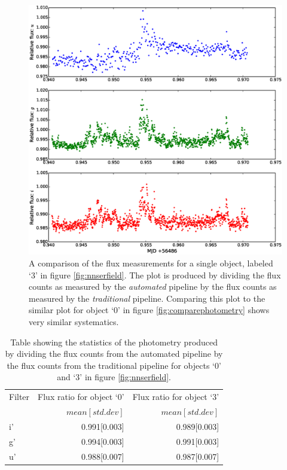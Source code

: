 \begin{figure}
\centering
\includegraphics[width=140mm]{images/compare_photometry_2.eps}
\caption{A comparison of the flux measurements for a single object, labeled `3' in figure \ref{fig:nnserfield}. The plot is produced by dividing the flux counts as measured by the \emph{automated} pipeline by the flux counts as measured by the \emph{traditional} pipeline. Comparing this plot to the similar plot for object `0' in figure \ref{fig:comparephotometry} shows very similar systematics.}
\label{fig:comparephotometry2}
\end{figure}

\begin{table}
  \centering
  \begin{tabular}{l r r }
    \hline
    Filter & Flux ratio for object `0' & Flux ratio  for object `3'\\
           &  $mean[std. dev]$ &  $mean[std. dev]$\\
    \hline
    i'    & 0.991[0.003]  & 0.989[0.003] \\
    g'    & 0.994[0.003] & 0.991[0.003]\\
    u'    & 0.988[0.007] & 0.987[0.007]\\
    \hline
   \end{tabular}
  \caption{Table showing the statistics of the photometry produced by dividing the flux counts from the automated pipeline by the flux counts from the traditional pipeline for objects `0'  and `3' in figure \ref{fig:nnserfield}.}
  \label{tab:differential}
\end{table}

